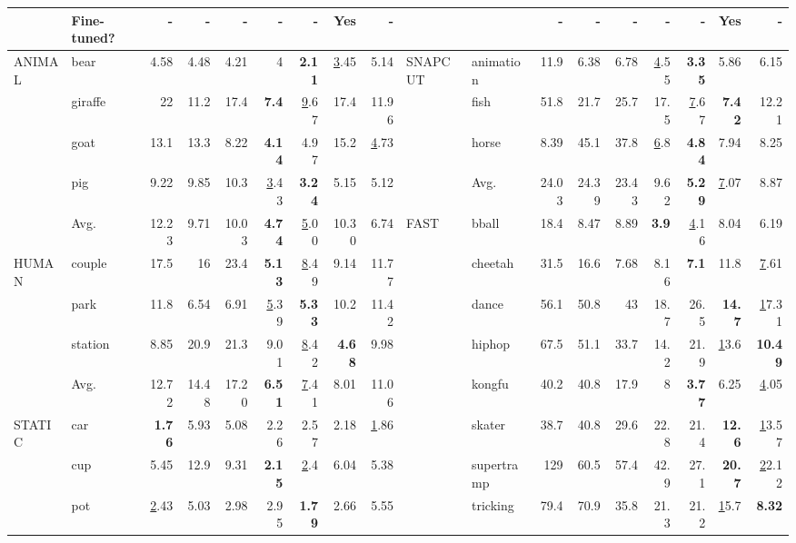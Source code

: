 \begin{table}[t]
{{\begin{tabular}{llrrrrrrrllrrrrrrr}
	&Fine-tuned? &- & - & - & - & -& Yes & - &  &  & - & - & - & - & - & Yes & -\\
	\midrule
	ANIMAL & bear          & 4.58  & 4.48  & 4.21  & 4     & {\bf 2.11}  & {\ul 3.45}  & 5.14 & SNAPCUT & animation  & 11.9  & 6.38  & 6.78  & {\ul 4.55}  & \bf 3.35  & 5.86  & 6.15 \\
	& giraffe       & 22    & 11.2  & 17.4  & \bf 7.4   & {\ul 9.67}  & 17.4  & 11.96 &         & fish       & 51.8  & 21.7  & 25.7  & 17.5  & {\ul 7.67}  & \bf 7.42  & 12.21 \\
	& goat          & 13.1  & 13.3  & 8.22  & \bf 4.14  & 4.97  & 15.2  & {\ul 4.73} &         & horse      & 8.39  & 45.1  & 37.8  & {\ul 6.8}   & \bf 4.84  & 7.94  &  8.25\\ \cline{11-18} 
	& pig           & 9.22  & 9.85  & 10.3  & {\ul 3.43}  & \bf 3.24  & 5.15  & 5.12 &         & Avg.       & 24.03 & 24.39 & 23.43 & 9.62  & \bf 5.29  & {\ul 7.07}  & 8.87 \\ \cline{2-18} 
	& Avg.          & 12.23 & 9.71  & 10.03 &\bf 4.74  & {\ul 5.00}  & 10.30 & 6.74 & FAST    & bball      & 18.4  & 8.47  & 8.89  & \bf 3.9   & {\ul 4.16}  & 8.04  & 6.19 \\ \cline{1-9}
	HUMAN  & couple        & 17.5  & 16    & 23.4  & \bf 5.13  & {\ul 8.49}  & 9.14  & 11.77 &         & cheetah    & 31.5  & 16.6  & 7.68  & 8.16  & \bf 7.1   & 11.8  &  {\ul 7.61} \\
	& park          & 11.8  & 6.54  & 6.91  & {\ul 5.39}  & \bf 5.33  & 10.2  & 11.42 &         & dance      & 56.1  & 50.8  & 43    & 18.7  & 26.5  & \bf 14.7  & {\ul 17.31} \\
	& station       & 8.85  & 20.9  & 21.3  & 9.01  &{\ul 8.42}  & \bf 4.68  & 9.98 &         & hiphop     & 67.5  & 51.1  & 33.7  & 14.2  & 21.9  & {\ul 13.6}  & \bf 10.49 \\ \cline{2-9}
	& Avg.          & 12.72 & 14.48 & 17.20 & \bf 6.51  & {\ul 7.41}  & 8.01  & 11.06 &         & kongfu     & 40.2  & 40.8  & 17.9  & 8     & \bf 3.77  & 6.25  & {\ul 4.05} \\ \cline{1-9}
	STATIC & car           & {\bf 1.76}  & 5.93  & 5.08  & 2.26  & 2.57  & 2.18  & {\ul 1.86} &         & skater     & 38.7  & 40.8  & 29.6  & 22.8  & 21.4  &{\bf 12.6}  & {\ul 13.57} \\
	& cup           & 5.45  & 12.9  & 9.31  & \bf 2.15  & {\ul 2.4}   & 6.04  & 5.38 &         & supertramp & 129   & 60.5  & 57.4  & 42.9  & 27.1  & \bf 20.7  & {\ul 22.12} \\
	& pot           & {\ul 2.43}  & 5.03  & 2.98  & 2.95  & \bf 1.79  & 2.66  & 5.55 &         & tricking   & 79.4  & 70.9  & 35.8  & 21.3  & 21.2  & {\ul 15.7}  &  \bf 8.32 \\ \cline{11-18} 

\end{tabular}}}
\end{table}
